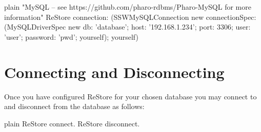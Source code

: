 \documentclass[10pt,twoside,english]{_support/latex/sbabook/sbabook}
\begin{document}
\begin{displaycode}{plain}
"MySQL – see https://github.com/pharo-rdbms/Pharo-MySQL for more information"
ReStore connection: 
(SSWMySQLConnection new 
	connectionSpec: 
		(MySQLDriverSpec new 
			db: 'database'; host: '192.168.1.234'; port: 3306; 
			user: 'user'; password: 'pwd'; 
		yourself); 
yourself)
\end{displaycode}
\section{Connecting and Disconnecting}
Once you have configured ReStore for your chosen database you may connect to and disconnect from the database as follows:

\begin{displaycode}{plain}
ReStore connect.
ReStore disconnect.
\end{displaycode}






\backmatter

\end{document}
